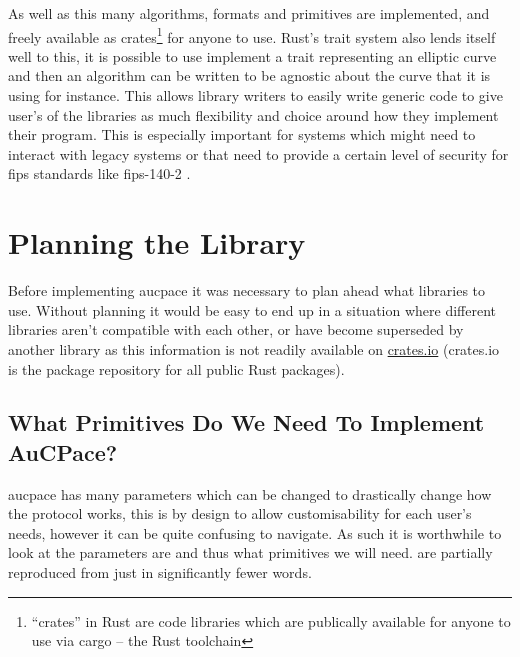 As well as this many algorithms, formats and primitives are implemented, and freely available as crates\footnote{\enquote{crates} in Rust are code libraries which are publically available for anyone to use via cargo -- the Rust toolchain} for anyone to use.
Rust's trait system also lends itself well to this, it is possible to use implement a trait representing an elliptic curve and then an algorithm can be written to be agnostic about the curve that it is using for instance.
This allows library writers to easily write generic code to give user's of the libraries as much flexibility and choice around how they implement their program.
This is especially important for systems which might need to interact with legacy systems or that need to provide a certain level of security for \gls{fips} standards like \gls{fips}-140-2 \cite{fips-140-2}.

\section{Planning the Library}
Before implementing \gls{aucpace} it was necessary to plan ahead what libraries to use.
Without planning it would be easy to end up in a situation where different libraries aren't compatible with each other, or have become superseded by another library as this information is not readily available on \href{https://crates.io/}{crates.io} (crates.io is the package repository for all public Rust packages).

\subsection{What Primitives Do We Need To Implement AuCPace?}
\gls{aucpace} has many parameters which can be changed to drastically change how the protocol works, this is by design to allow customisability for each user's needs, however it can be quite confusing to navigate.
As such it is worthwhile to look at the parameters are and thus what primitives we will need.
 are partially reproduced from \cite{aucpace} just in significantly fewer words.

